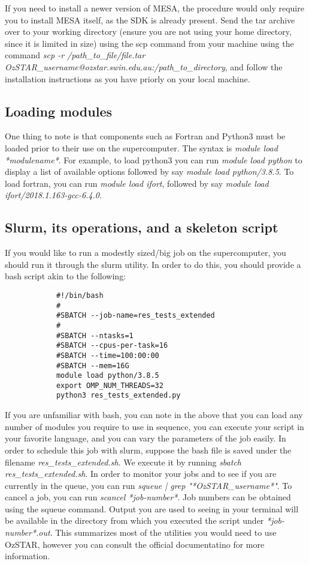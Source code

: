 \documentclass[12pt,hidelinks]{article}
\begin{document}
        \vspace{0.5cm}
        If you need to install a newer version of MESA, the procedure would only require you to install MESA itself, as the SDK is already present. Send the tar archive over to your working directory (ensure you are not using your home directory, since it is limited in size) using the scp command from your machine using the command \emph{scp -r /path\_to\_file/file.tar OzSTAR\_username@ozstar.swin.edu.au:/path\_to\_directory}, and follow the installation instructions as you have priorly on your local machine. 
        
    \subsection{Loading modules}
        One thing to note is that components such as Fortran and Python3 must be loaded prior to their use on the supercomputer. The syntax is \emph{module load *modulename*}. For example, to load python3 you can run \emph{module load python} to display a list of available options followed by say \emph{module load python/3.8.5}. To load fortran, you can run \emph{module load ifort}, followed by say \emph{module load ifort/2018.1.163-gcc-6.4.0}.
        
    \subsection{Slurm, its operations, and a skeleton script}
        If you would like to run a modestly sized/big job on the supercomputer, you should run it through the slurm utility. In order to do this, you should provide a bash script akin to the following:
        
        \begin{lstlisting}
            #!/bin/bash
            #
            #SBATCH --job-name=res_tests_extended 
            #
            #SBATCH --ntasks=1
            #SBATCH --cpus-per-task=16
            #SBATCH --time=100:00:00
            #SBATCH --mem=16G
            module load python/3.8.5
            export OMP_NUM_THREADS=32
            python3 res_tests_extended.py
        \end{lstlisting}
        
        If you are unfamiliar with bash, you can note in the above that you can load any number of modules you require to use in sequence, you can execute your script in your favorite language, and you can vary the parameters of the job easily. In order to schedule this job with slurm, suppose the bash file is saved under the filename \emph{res\_tests\_extended.sh}. We execute it by running \emph{sbatch res\_tests\_extended.sh}. In order to monitor your jobs and to see if you are currently in the queue, you can run \emph{squeue | grep "*OzSTAR\_username*"}. To cancel a job, you can run \emph{scancel *job-number*}. Job numbers can be obtained using the squeue command. Output you are used to seeing in your terminal will be available in the directory from which you executed the script under \emph{*job-number*.out}. This summarizes most of the utilities you would need to use OzSTAR, however you can consult the official documentatino for more information.
    
    
\newpage

\end{document}
